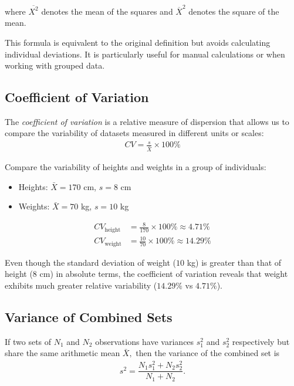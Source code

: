 where $\overline{X^2}$ denotes the mean of the squares and $\overline{X}^2$ denotes the square of the mean.

\begin{remark}
	This formula is equivalent to the original definition but avoids calculating individual deviations. It is particularly useful for manual calculations or when working with grouped data.
\end{remark}


\subsection{Coefficient of Variation}
The \emph{coefficient of variation} is a relative measure of dispersion that allows us to compare the variability of datasets measured in different units or scales:
\begin{align}
	CV = \frac{s}{\bar{X}} \times 100\%
\end{align}

\begin{example}
	Compare the variability of heights and weights in a group of individuals:
	\begin{itemize}
		\item Heights: $\bar{X} = 170$ cm, $s = 8$ cm
		\item Weights: $\bar{X} = 70$ kg, $s = 10$ kg
	\end{itemize}
\end{example}

\begin{solution}
	\begin{align}
		CV_{\text{height}} &= \frac{8}{170} \times 100\% \approx 4.71\% \\
		CV_{\text{weight}} &= \frac{10}{70} \times 100\% \approx 14.29\%
	\end{align}
	
	Even though the standard deviation of weight ($10$ kg) is greater than that of height ($8$ cm) in absolute terms, the coefficient of variation reveals that weight exhibits much greater relative variability ($14.29\%$ vs $4.71\%$).
\end{solution}


\subsection{Variance of Combined Sets}
If two sets of $N_{1}$ and $N_{2}$ observations have variances $s_{1}^{2}$ and $s_{2}^{2}$ respectively but share the same arithmetic mean $\bar{X},$ then the variance of the combined set is
\begin{align}
	s^{2}=\dfrac{N_{1}s_{1}^{2}+N_{2}s_{2}^{2}}{N_{1}+N_{2}}.
\end{align}


